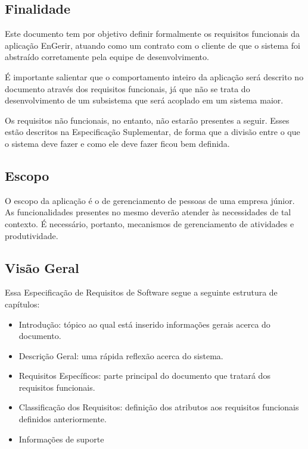 \subsection{Finalidade}

  Este documento tem por objetivo definir formalmente os requisitos funcionais da aplicação EnGerir, atuando como um contrato com o cliente de que o sistema foi abstraído corretamente pela equipe de desenvolvimento.

  É importante salientar que o comportamento inteiro da aplicação será descrito no documento através dos requisitos funcionais, já que não se trata do desenvolvimento de um subsistema que será acoplado em um sistema maior.

  Os requisitos não funcionais, no entanto, não estarão presentes a seguir. Esses estão descritos na Especificação Suplementar, de forma que a divisão entre o que o sistema deve fazer e como ele deve fazer ficou bem definida.

\subsection{Escopo}

O escopo da aplicação é o de gerenciamento de pessoas de uma empresa júnior. As funcionalidades presentes no mesmo deverão atender às necessidades de tal contexto. É necessário, portanto, mecanismos de gerenciamento de atividades e produtividade.

\subsection{Visão Geral}

Essa Especificação de Requisitos de Software segue a seguinte estrutura de capítulos:

\begin{itemize}
\item{Introdução: tópico ao qual está inserido informações gerais acerca do documento.}
\item{Descrição Geral: uma rápida reflexão acerca do sistema.}
\item{Requisitos Específicos: parte principal do documento que tratará dos requisitos funcionais.}
\item{Classificação dos Requisitos: definição dos atributos aos requisitos funcionais definidos anteriormente.}
\item{Informações de suporte}
\end{itemize}

